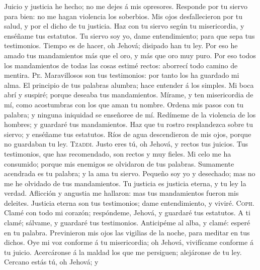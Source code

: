 Juicio y justicia he hecho; no me dejes á mis opresores.
 Responde por tu siervo para bien: no me hagan violencia
los soberbios.  Mis ojos desfallecieron por tu salud, y
por el dicho de tu justicia.  Haz con tu siervo según tu
misericordia, y enséñame tus estatutos.  Tu siervo soy
yo, dame entendimiento; para que sepa tus testimonios. 
Tiempo es de hacer, oh Jehová; disipado han tu ley.  Por
eso he amado tus mandamientos más que el oro, y más que oro muy puro.
 Por eso todos los mandamientos de todas las cosas
estimé rectos: aborrecí todo camino de mentira. 
\textsc{Pe}. Maravillosos son tus testimonios: por tanto los ha guardado
mi alma.  El principio de tus palabras alumbra; hace
entender á los simples.  Mi boca abrí y suspiré; porque
deseaba tus mandamientos.  Mírame, y ten misericordia de
mí, como acostumbras con los que aman tu nombre.  Ordena
mis pasos con tu palabra; y ninguna iniquidad se enseñoree de mí.
 Redímeme de la violencia de los hombres; y guardaré tus
mandamientos.  Haz que tu rostro resplandezca sobre tu
siervo; y enséñame tus estatutos.  Ríos de agua
descendieron de mis ojos, porque no guardaban tu ley. 
\textsc{Tzaddi}. Justo eres tú, oh Jehová, y rectos tus juicios.
 Tus testimonios, que has recomendado, son rectos y muy
fieles.  Mi celo me ha consumido; porque mis enemigos se
olvidaron de tus palabras.  Sumamente acendrada es tu
palabra; y la ama tu siervo.  Pequeño soy yo y
desechado; mas no me he olvidado de tus mandamientos. 
Tu justicia es justicia eterna, y tu ley la verdad. 
Aflicción y angustia me hallaron: mas tus mandamientos fueron mis
deleites.  Justicia eterna son tus testimonios; dame
entendimiento, y viviré.  \textsc{Coph}. Clamé con todo
mi corazón; respóndeme, Jehová, y guardaré tus estatutos.
 A ti clamé; sálvame, y guardaré tus testimonios.
 Anticipéme al alba, y clamé: esperé en tu palabra.
 Previnieron mis ojos las vigilias de la noche, para
meditar en tus dichos.  Oye mi voz conforme á tu
misericordia; oh Jehová, vivifícame conforme á tu juicio.
 Acercáronse á la maldad los que me persiguen;
alejáronse de tu ley.  Cercano estás tú, oh Jehová; y
